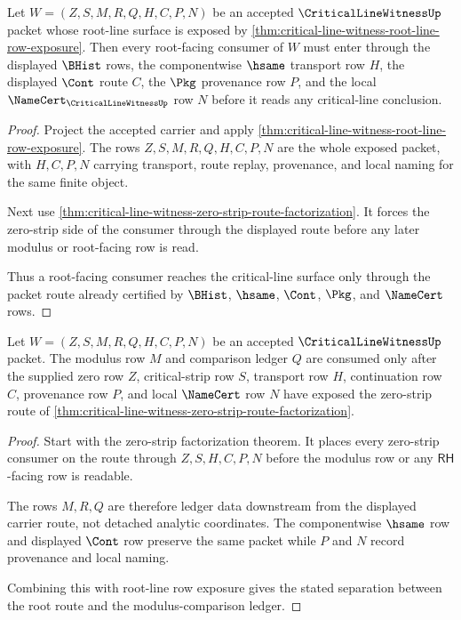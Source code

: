 \begin{theorem}
\label{thm:critical-line-witness-p11961-root-route-exposure}
Let $W=(Z,S,M,R,Q,H,C,P,N)$ be an accepted $\CriticalLineWitnessUp$ packet whose root-line surface is exposed by \autoref{thm:critical-line-witness-root-line-row-exposure}. Then every root-facing consumer of $W$ must enter through the displayed $\BHist$ rows, the componentwise $\hsame$ transport row $H$, the displayed $\Cont$ route $C$, the $\Pkg$ provenance row $P$, and the local $\NameCert_{\CriticalLineWitnessUp}$ row $N$ before it reads any critical-line conclusion.
\end{theorem}
\begin{proof}
Project the accepted carrier and apply \autoref{thm:critical-line-witness-root-line-row-exposure}. The rows $Z,S,M,R,Q,H,C,P,N$ are the whole exposed packet, with $H,C,P,N$ carrying transport, route replay, provenance, and local naming for the same finite object.

Next use \autoref{thm:critical-line-witness-zero-strip-route-factorization}. It forces the zero-strip side of the consumer through the displayed route before any later modulus or root-facing row is read.

Thus a root-facing consumer reaches the critical-line surface only through the packet route already certified by $\BHist$, $\hsame$, $\Cont$, $\Pkg$, and $\NameCert$ rows.
\end{proof}

\begin{theorem}
\label{thm:critical-line-witness-p11961-modulus-ledger-separation}
Let $W=(Z,S,M,R,Q,H,C,P,N)$ be an accepted $\CriticalLineWitnessUp$ packet. The modulus row $M$ and comparison ledger $Q$ are consumed only after the supplied zero row $Z$, critical-strip row $S$, transport row $H$, continuation row $C$, provenance row $P$, and local $\NameCert$ row $N$ have exposed the zero-strip route of \autoref{thm:critical-line-witness-zero-strip-route-factorization}.
\end{theorem}
\begin{proof}
Start with the zero-strip factorization theorem. It places every zero-strip consumer on the route through $Z,S,H,C,P,N$ before the modulus row or any $\mathsf{RH}$-facing row is readable.

The rows $M,R,Q$ are therefore ledger data downstream from the displayed carrier route, not detached analytic coordinates. The componentwise $\hsame$ row and displayed $\Cont$ row preserve the same packet while $P$ and $N$ record provenance and local naming.

Combining this with root-line row exposure gives the stated separation between the root route and the modulus-comparison ledger.
\end{proof}

